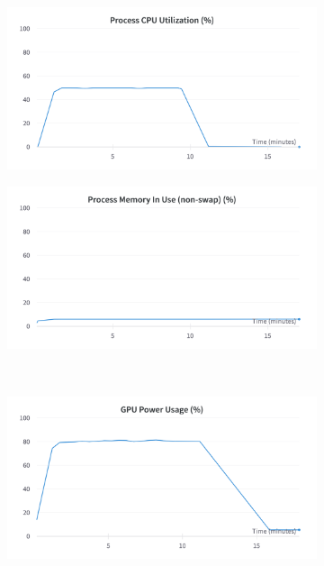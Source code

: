 \begin{figure}[H]
	\centering
	\begin{subfigure}{0.43\textwidth}
		\centering
		\includegraphics[width=\textwidth]{chapters/3_models/imgs/gab/train/gabrielcputilization.png}
	\end{subfigure}
	\begin{subfigure}{0.43\textwidth}
		\centering
		\includegraphics[width=\textwidth]{chapters/3_models/imgs/gab/train/gabrielprocessmemory.png}
	\end{subfigure}\\
	\begin{subfigure}{0.43\textwidth}
		\centering
		\includegraphics[width=\textwidth]{chapters/3_models/imgs/gab/train/gabrielgpupowerusageperc.png}

\end{subfigure}
\end{figure}
